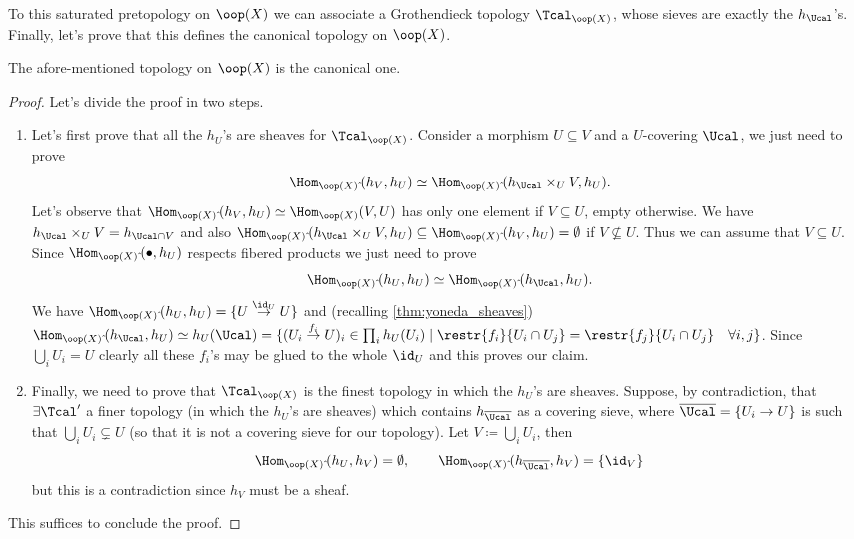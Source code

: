 \documentclass[a4paper]{article}
\begin{document}
         To this saturated pretopology on $\oop(X)$ we can associate a Grothendieck topology $\Tcal_{\oop(X)}$, whose sieves are exactly the $h_{\Ucal}$'s.
         Finally, let's prove that this defines the canonical topology on $\oop(X)$.
         \begin{prop}
             The afore-mentioned topology on $\oop(X)$ is the canonical one.
         \end{prop}
         \begin{proof}
             Let's divide the proof in two steps.
             \begin{enumerate}
                 \item Let's first prove that all the $h_U$'s are sheaves for $\Tcal_{\oop(X)}$. Consider a morphism $U \subseteq V$ and a $U$-covering $\Ucal$, we just need to prove \[\Hom_{\oop(X)\,\hat{}}(h_V, h_U) \simeq \Hom_{\oop(X)\,\hat{}}(h_{\Ucal} \times_U V, h_U). \] Let's observe that $\Hom_{\oop(X)\,\hat{}}(h_V, h_U) \simeq \Hom_{\oop(X)}(V, U)$ has only one element if $V \subseteq U$, empty otherwise. We have $h_{\Ucal} \times_U V = h_{\Ucal \cap V}$ and also $\Hom_{\oop(X)\,\hat{}}(h_{\Ucal} \times_U V, h_U) \subseteq \Hom_{\oop(X)\,\hat{}}(h_V, h_U)= \emptyset$ if $V \not\subseteq U$. Thus we can assume that $V \subseteq U$. Since $\Hom_{\oop(X)\,\hat{}}(\bullet, h_U)$ respects fibered products we just need to prove \[\Hom_{\oop(X)\,\hat{}}(h_U, h_U) \simeq \Hom_{\oop(X)\,\hat{}}(h_{\Ucal}, h_U). \] We have $\Hom_{\oop(X)\,\hat{}}(h_U, h_U) = \{U \stackrel{\id_U}{\to} U\}$ and (recalling \cref{thm:yoneda_sheaves}) $\Hom_{\oop(X)\,\hat{}}(h_{\Ucal}, h_U) \simeq h_U(\Ucal) = \{(U_i \stackrel{f_i}{\to} U)_i \in \prod_i h_U(U_i) \mid \restr{f_i}{U_i \cap U_j} = \restr{f_j}{U_i \cap U_j} \quad \forall i,j\}$. Since $\bigcup_i U_i = U$ clearly all these $f_i$'s may be glued to the whole $\id_U$ and this proves our claim.
                 \item Finally, we need to prove that $\Tcal_{\oop(X)}$ is the finest topology in which the $h_U$'s are sheaves. Suppose, by contradiction, that $\exists \Tcal'$ a finer topology (in which the $h_U$'s are sheaves) which contains $h_{\overline{\Ucal}}$ as a covering sieve, where $\overline{\Ucal} = \{U_i \to U\}$ is such that $\bigcup_i U_i \subsetneq U$ (so that it is not a covering sieve for our topology). Let $V\coloneqq \bigcup_i U_i$, then \[\Hom_{\oop(X)\,\hat{}}(h_U, h_V) = \emptyset, \qquad \Hom_{\oop(X)\,\hat{}}(h_{\overline{\Ucal}}, h_V) = \{\id_V\} \] but this is a contradiction since $h_V$ must be a sheaf.
             \end{enumerate}
             This suffices to conclude the proof.
         \end{proof}
    \nocite{troietto,vistoli}
    \printbibliography
\end{document}
